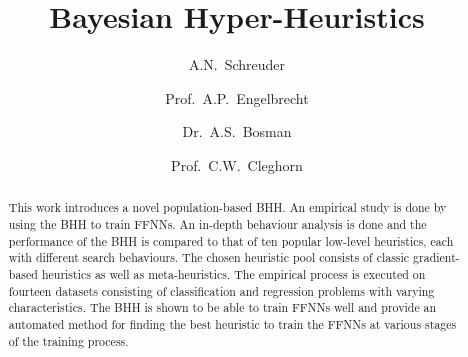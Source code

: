 \documentclass[preprint,review,12pt]{elsarticle}
\begin{document}
\begin{frontmatter}


  \title{Bayesian Hyper-Heuristics}

  \author[aff:tuks]{A.N.~Schreuder}
  \author[aff:stellenbosch]{Prof.~A.P.~Engelbrecht}
  \author[aff:tuks]{Dr.~A.S.~Bosman}
  \author[aff:wits]{Prof.~C.W.~Cleghorn}




  \begin{abstract}

    This work introduces a novel population-based \Acf{BHH}. An empirical study is done by using the \acs{BHH} to train \acsp{FFNN}. An in-depth behaviour analysis is done and the performance of the \acs{BHH} is compared to that of ten popular low-level heuristics, each with different search behaviours. The chosen heuristic pool consists of classic gradient-based heuristics as well as meta-heuristics. The empirical process is executed on fourteen datasets consisting of classification and regression problems with varying characteristics. The \acs{BHH} is shown to be able to train \acsp{FFNN} well and provide an automated method for finding the best heuristic to train the \acsp{FFNN} at various stages of the training process.


\end{abstract}
\end{frontmatter}
\end{document}
